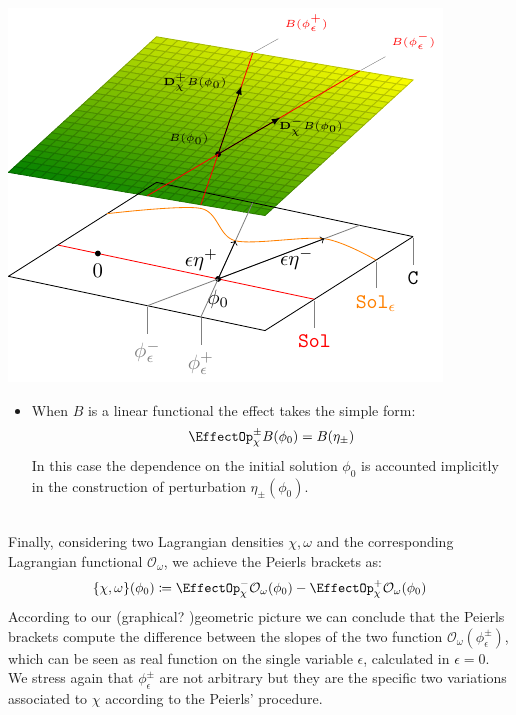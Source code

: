\documentclass[Main]{subfiles}
\begin{document}
		\vspace{1mm}		
		\begin{minipage}{0.5\textwidth}
			\includegraphics[width=\textwidth]{Pictures/GeometricPictureLinear1}
		\end{minipage}
		\begin{minipage}{0.5\textwidth}
			\begin{itemize}
				\item  When $B$ is a linear functional the effect takes the simple form:
					\begin{displaymath}
						\EffectOp_\chi^\pm B (\phi_0) = B ( \eta_\pm)
					\end{displaymath}
					In this case the dependence on the initial solution $\phi_0$ is accounted implicitly in the construction of perturbation $\eta_\pm(\phi_0)$.
			\end{itemize}
		\end{minipage}
		\vspace{1mm}\\	

		Finally, 
		considering two Lagrangian densities $\chi, \omega$ and the corresponding Lagrangian functional $ \mathcal{O}_\omega$, we achieve the Peierls brackets as:
		\begin{displaymath}
			\{\chi, \omega \}(\phi_0) \coloneqq \EffectOp_\chi^- \mathcal{O}_\omega (\phi_0) - \EffectOp_\chi^+ \mathcal{O}_\omega(\phi_0)
		\end{displaymath}
		According to our \ifToninus (\danger graphical? \danger)\fi geometric picture we can conclude that the Peierls brackets compute the difference between the slopes of the two function $\mathcal{O}_\omega ( \phi_\epsilon^\pm)$, which can be seen as real function on the single variable $\epsilon$, calculated in $\epsilon=0$.
		We stress again that $ \phi_\epsilon^\pm$ are not arbitrary but they are the specific two variations associated to $\chi$ according to the Peierls' procedure.
		
\end{document}
